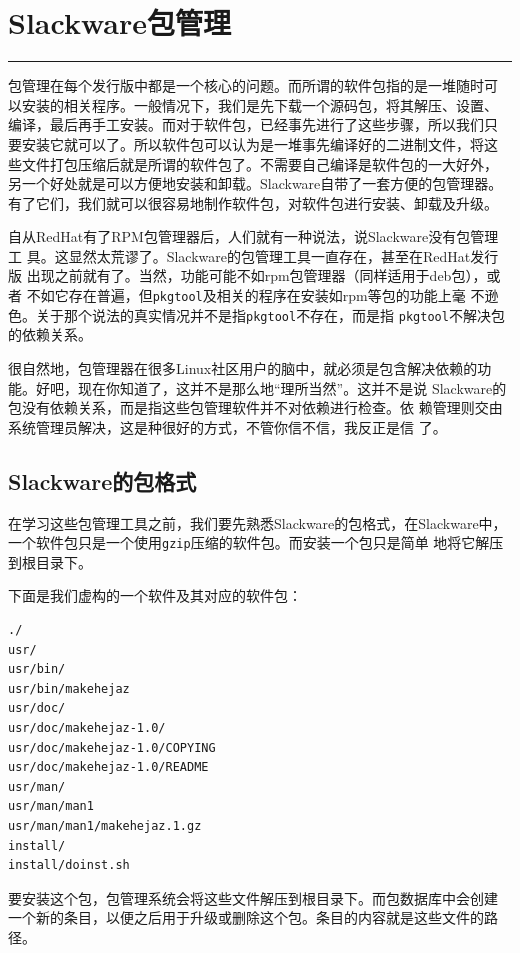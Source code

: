 
\chapter{Slackware包管理}
\label{chap:packageManagement}
\begin{flushleft}
\rule[0mm]{\textwidth}{.1pt}
\end{flushleft}

包管理在每个发行版中都是一个核心的问题。而所谓的软件包指的是一堆随时可
以安装的相关程序。一般情况下，我们是先下载一个源码包，将其解压、设置、
编译，最后再手工安装。而对于软件包，已经事先进行了这些步骤，所以我们只
要安装它就可以了。所以软件包可以认为是一堆事先编译好的二进制文件，将这
些文件打包压缩后就是所谓的软件包了。不需要自己编译是软件包的一大好外，
另一个好处就是可以方便地安装和卸载。Slackware自带了一套方便的包管理器。
有了它们，我们就可以很容易地制作软件包，对软件包进行安装、卸载及升级。

自从RedHat有了RPM包管理器后，人们就有一种说法，说Slackware没有包管理工
具。这显然太荒谬了。Slackware的包管理工具一直存在，甚至在RedHat发行版
出现之前就有了。当然，功能可能不如rpm包管理器（同样适用于deb包），或者
不如它存在普遍，但\texttt{pkgtool}及相关的程序在安装如rpm等包的功能上毫
不逊色。关于那个说法的真实情况并不是指\texttt{pkgtool}不存在，而是指
\texttt{pkgtool}不解决包的依赖关系。

很自然地，包管理器在很多Linux社区用户的脑中，就必须是包含解决依赖的功
能。好吧，现在你知道了，这并不是那么地``理所当然''。这并不是说
Slackware的包没有依赖关系，而是指这些包管理软件并不对依赖进行检查。依
赖管理则交由系统管理员解决，这是种很好的方式，不管你信不信，我反正是信
了。

\section{Slackware的包格式}
\label{sec:packageManagement:format}
在学习这些包管理工具之前，我们要先熟悉Slackware的包格式，在Slackware中，
一个软件包只是一个使用\texttt{gzip}压缩的软件包。而安装一个包只是简单
地将它解压到根目录下。

下面是我们虚构的一个软件及其对应的软件包：
\begin{Verbatim}[frame=single, commandchars=\\\{\}]
./
usr/
usr/bin/
usr/bin/makehejaz
usr/doc/
usr/doc/makehejaz-1.0/
usr/doc/makehejaz-1.0/COPYING
usr/doc/makehejaz-1.0/README
usr/man/
usr/man/man1
usr/man/man1/makehejaz.1.gz
install/
install/doinst.sh
\end{Verbatim}
要安装这个包，包管理系统会将这些文件解压到根目录下。而包数据库中会创建
一个新的条目，以便之后用于升级或删除这个包。条目的内容就是这些文件的路
径。

